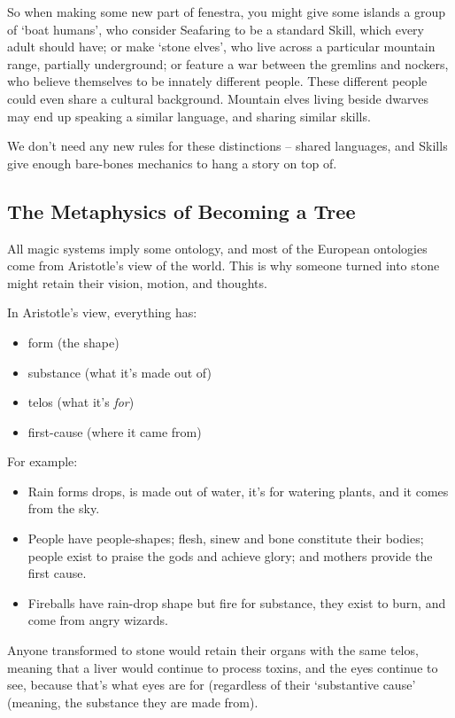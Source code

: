 \begin{multicols}{2}
So when making some new part of \gls{fenestra}, you might give some islands a group of `boat humans', who consider Seafaring to be a standard Skill, which every adult should have; or make `stone elves', who live across a particular mountain range, partially underground; or feature a war between the gremlins and nockers, who believe themselves to be innately different people.
These different people could even share a cultural background.
Mountain elves living beside dwarves may end up speaking a similar language, and sharing similar skills.

We don't need any new rules for these distinctions -- shared languages, and Skills give enough bare-bones mechanics to hang a story on top of.

\subsection{The Metaphysics of Becoming a Tree}

All magic systems imply some ontology, and most of the European ontologies come from Aristotle's view of the world.
This is why someone turned into stone might retain their vision, motion, and thoughts.

In Aristotle's view, everything has:

\begin{itemize}
  \item
  form (the shape)
  \item
  substance (what it's made out of)
  \item
  telos (what it's \emph{for})
  \item
  first-cause (where it came from)
\end{itemize}

For example:

\begin{itemize}
  \item
  Rain forms drops, is made out of water, it's for watering plants, and it comes from the sky.
  \item
  People have people-shapes; flesh, sinew and bone constitute their bodies; people exist to praise the gods and achieve glory; and mothers provide the first cause.
  \item
  Fireballs have rain-drop shape but fire for substance, they exist to burn, and come from angry wizards.
\end{itemize}

Anyone transformed to stone would retain their organs with the same telos, meaning that a liver would continue to process toxins, and the eyes continue to see, because that's what eyes are for (regardless of their `substantive cause' (meaning, the substance they are made from).


\end{multicols}
